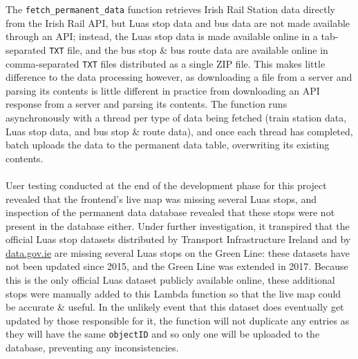 \documentclass[a4paper,11pt]{report}
\begin{document}
The \verb|fetch_permanent_data| function retrieves Irish Rail Station data directly from the Irish Rail API, but Luas stop data and bus data are not made available through an API;
instead, the Luas stop data is made available online in a tab-separated \verb|TXT| file, and the bus stop \& bus route data are available online in comma-separated \verb|TXT| files distributed as a single ZIP file.
This makes little difference to the data processing however, as downloading a file from a server and parsing its contents is little different in practice from downloading an API response from a server and parsing its contents.
The function runs asynchronously with a thread per type of data being fetched (train station data, Luas stop data, and bus stop \& route data), and once each thread has completed, batch uploads the data to the permanent data table, overwriting its existing contents.
\\\\
User testing conducted at the end of the development phase for this project revealed that the frontend's live map was missing several Luas stops, and inspection of the permanent data database revealed that these stops were not present in the database either.
Under further investigation, it transpired that the official Luas stop datasets distributed by Transport Infrastructure Ireland and by \url{data.gov.ie} are missing several Luas stops on the Green Line\supercite{tfiluasdata, luasstopsdata}:
these datasets have not been updated since 2015, and the Green Line was extended in 2017\supercite{greenlineextension}.
Because this is the only official Luas dataset publicly available online, these additional stops were manually added to this Lambda function so that the live map could be accurate \& useful.
In the unlikely event that this dataset does eventually get updated by those responsible for it, the function will not duplicate any entries as they will have the same \verb|objectID| and so only one will be uploaded to the database, preventing any inconsistencies.
\end{document}
